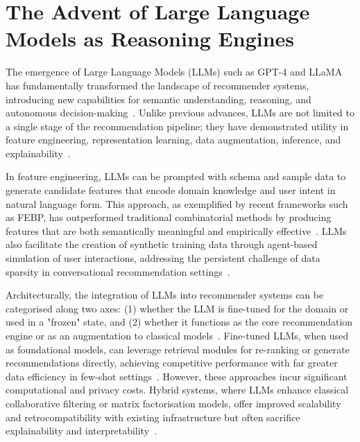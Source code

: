 \section{The Advent of Large Language Models as Reasoning Engines}
\label{sec:intro_llms}

The emergence of Large Language Models (LLMs) such as GPT-4 and LLaMA has fundamentally transformed the landscape of recommender systems, introducing new capabilities for semantic understanding, reasoning, and autonomous decision-making~\cite{Touvron2023LLaMA, Wang2024RecMind, Zhang2023AgentCF}. Unlike previous advances, LLMs are not limited to a single stage of the recommendation pipeline; they have demonstrated utility in feature engineering, representation learning, data augmentation, inference, and explainability~\cite{Wang2023LLMAgentsSurvey, Zou2025FEBP}.

In feature engineering, LLMs can be prompted with schema and sample data to generate candidate features that encode domain knowledge and user intent in natural language form. This approach, as exemplified by recent frameworks such as FEBP, has outperformed traditional combinatorial methods by producing features that are both semantically meaningful and empirically effective~\cite{Zou2025FEBP}. LLMs also facilitate the creation of synthetic training data through agent-based simulation of user interactions, addressing the persistent challenge of data sparsity in conversational recommendation settings~\cite{Wang2024RecMind, Mysore2023NarrativeDriven}.

Architecturally, the integration of LLMs into recommender systems can be categorised along two axes: (1) whether the LLM is fine-tuned for the domain or used in a "frozen" state, and (2) whether it functions as the core recommendation engine or as an augmentation to classical models~\cite{Xu2024Prompting, Lin2024Survey}. Fine-tuned LLMs, when used as foundational models, can leverage retrieval modules for re-ranking or generate recommendations directly, achieving competitive performance with far greater data efficiency in few-shot settings~\cite{Cao2024Aligning}. However, these approaches incur significant computational and privacy costs. Hybrid systems, where LLMs enhance classical collaborative filtering or matrix factorisation models, offer improved scalability and retrocompatibility with existing infrastructure but often sacrifice explainability and interpretability~\cite{Qiu2021UBERT}.


